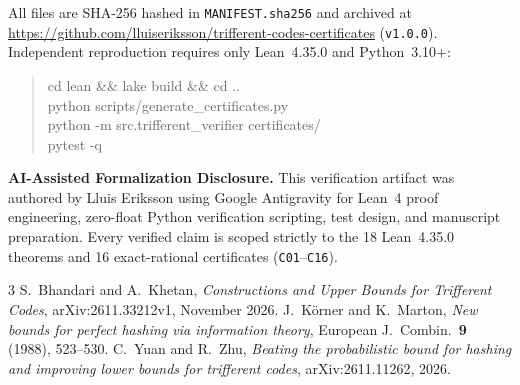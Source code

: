 \documentclass[10pt,twocolumn]{article}
\begin{document}
All files are SHA-256 hashed in \texttt{MANIFEST.sha256} and archived at \url{https://github.com/lluiseriksson/trifferent-codes-certificates} (\texttt{v1.0.0}). Independent reproduction requires only Lean~4.35.0 and Python~3.10+:
\begin{quote}\raggedright\footnotesize\ttfamily
cd lean \&\& lake build \&\& cd ..\\
python scripts/generate\_certificates.py\\
python -m src.trifferent\_verifier certificates/\\
pytest -q
\end{quote}
\noindent\textbf{AI-Assisted Formalization Disclosure.} This verification artifact was authored by Lluis Eriksson using Google Antigravity for Lean~4 proof engineering, zero-float Python verification scripting, test design, and manuscript preparation. Every verified claim is scoped strictly to the 18 Lean~4.35.0 theorems and 16 exact-rational certificates (\texttt{C01}--\texttt{C16}).

\begin{thebibliography}{3}
S.~Bhandari and A.~Khetan,
\emph{Constructions and Upper Bounds for Trifferent Codes},
arXiv:2611.33212v1, November 2026.
J.~K\"{o}rner and K.~Marton,
\emph{New bounds for perfect hashing via information theory},
European J.\ Combin.\ \textbf{9} (1988), 523--530.
C.~Yuan and R.~Zhu,
\emph{Beating the probabilistic bound for hashing and improving lower bounds for trifferent codes},
arXiv:2611.11262, 2026.
\end{thebibliography}
\end{document}
